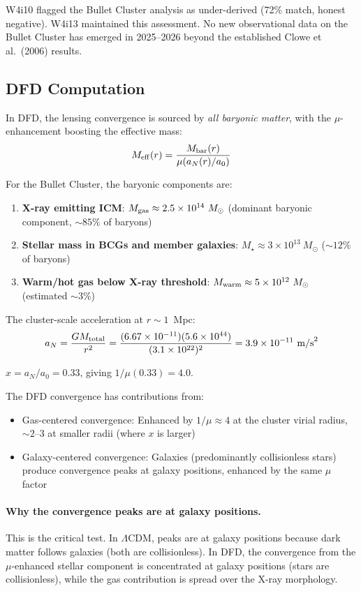 \documentclass[11pt,a4paper]{article}
\newcommand{\LCDM}{$\Lambda$CDM}
\newcommand{\ee}[1]{\times 10^{#1}}
\begin{document}
W4i10 flagged the Bullet Cluster analysis as under-derived (72\% match,
honest negative).  W4i13 maintained this assessment.  No new observational
data on the Bullet Cluster has emerged in 2025--2026 beyond the
established Clowe et al.\ (2006) results.

\subsection{DFD Computation}

In DFD, the lensing convergence is sourced by \emph{all baryonic matter},
with the $\mu$-enhancement boosting the effective mass:
\begin{equation}
M_{\rm eff}(r) = \frac{M_{\rm bar}(r)}{\mu(a_N(r)/a_0)}
\end{equation}

For the Bullet Cluster, the baryonic components are:
\begin{enumerate}
\item \textbf{X-ray emitting ICM}: $M_{\rm gas} \approx 2.5\ee{14}~M_\odot$
  (dominant baryonic component, $\sim 85\%$ of baryons)
\item \textbf{Stellar mass in BCGs and member galaxies}:
  $M_\star \approx 3\ee{13}~M_\odot$ ($\sim 12\%$ of baryons)
\item \textbf{Warm/hot gas below X-ray threshold}:
  $M_{\rm warm} \approx 5\ee{12}~M_\odot$ (estimated $\sim 3\%$)
\end{enumerate}

The cluster-scale acceleration at $r \sim 1$~Mpc:
\begin{equation}
a_N = \frac{G M_{\rm total}}{r^2}
= \frac{(6.67\ee{-11})(5.6\ee{44})}{(3.1\ee{22})^2}
= 3.9\ee{-11}~\text{m/s}^2
\end{equation}

$x = a_N/a_0 = 0.33$, giving $1/\mu(0.33) = 4.0$.

The DFD convergence has contributions from:
\begin{itemize}
\item Gas-centered convergence: Enhanced by $1/\mu \approx 4$ at
  the cluster virial radius, $\sim 2$--$3$ at smaller radii (where
  $x$ is larger)
\item Galaxy-centered convergence: Galaxies (predominantly collisionless
  stars) produce convergence peaks at galaxy positions, enhanced by
  the same $\mu$ factor
\end{itemize}

\paragraph{Why the convergence peaks are at galaxy positions.}
This is the critical test.  In \LCDM, peaks are at galaxy positions
because dark matter follows galaxies (both are collisionless).
In DFD, the convergence from the $\mu$-enhanced stellar component
is concentrated at galaxy positions (stars are collisionless), while
the gas contribution is spread over the X-ray morphology.
\end{document}
